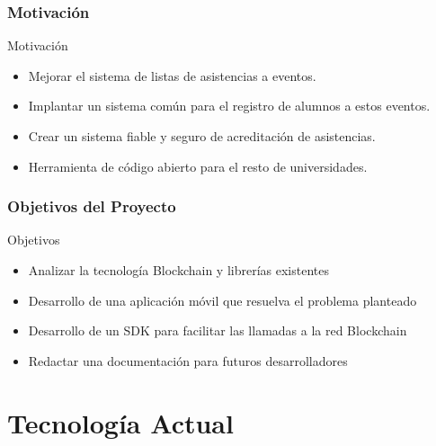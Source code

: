 \documentclass[usenames,dvipsnames]{beamer}
\begin{document}
\begin{frame} 
\frametitle{Motivación} 
  \begin{block}{Motivación}
    \begin{itemize}
      \item Mejorar el sistema de listas de asistencias a eventos.
      \item Implantar un sistema común para el registro de alumnos a estos eventos.
      \item Crear un sistema fiable y seguro de acreditación de asistencias.
      \item Herramienta de código abierto para el resto de universidades.
    \end{itemize}
  \end{block} 
\end{frame}

\begin{frame} 
\frametitle{Objetivos del Proyecto} 
  \begin{block}{Objetivos}
    \begin{itemize}
      \item Analizar la tecnología Blockchain y librerías existentes
      \item Desarrollo de una aplicación móvil que resuelva el problema planteado
      \item Desarrollo de un SDK para facilitar las llamadas a la red Blockchain
      \item Redactar una documentación para futuros desarrolladores
    \end{itemize}
  \end{block}
\end{frame}


\section{Tecnología Actual}
\end{document}
